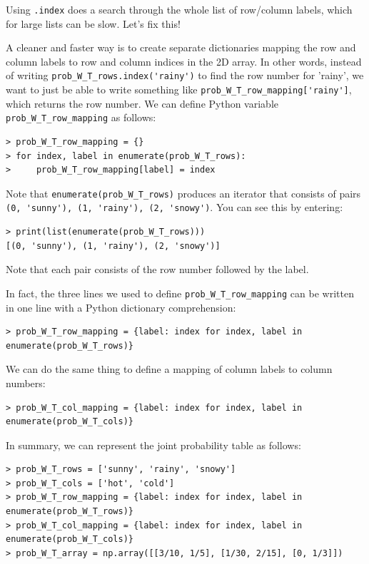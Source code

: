 \documentclass[6008notes.tex]{subfiles}
\begin{document}
Using \texttt{.index} does a search through the whole list of row/column labels, which for large lists can be slow. Let's fix this!

A cleaner and faster way is to create separate dictionaries mapping the row and column labels to row and column indices in the 2D array. In other words, instead of writing \lstinline{prob_W_T_rows.index('rainy')} to find the row number for 'rainy', we want to just be able to write something like \lstinline{prob_W_T_row_mapping['rainy']}, which returns the row number. We can define Python variable \lstinline{prob_W_T_row_mapping} as follows:

\begin{lstlisting}
> prob_W_T_row_mapping = {}
> for index, label in enumerate(prob_W_T_rows):
>     prob_W_T_row_mapping[label] = index
\end{lstlisting}

Note that \lstinline{enumerate(prob_W_T_rows)} produces an iterator that consists of pairs \lstinline{(0, 'sunny'), (1, 'rainy'), (2, 'snowy')}. You can see this by entering:

\begin{lstlisting}
> print(list(enumerate(prob_W_T_rows)))
[(0, 'sunny'), (1, 'rainy'), (2, 'snowy')]
\end{lstlisting}

Note that each pair consists of the row number followed by the label.

In fact, the three lines we used to define \lstinline{prob_W_T_row_mapping} can be written in one line with a Python dictionary comprehension:

\begin{lstlisting}
> prob_W_T_row_mapping = {label: index for index, label in enumerate(prob_W_T_rows)}
\end{lstlisting}

We can do the same thing to define a mapping of column labels to column numbers:

\begin{lstlisting}
> prob_W_T_col_mapping = {label: index for index, label in enumerate(prob_W_T_cols)}
\end{lstlisting}

In summary, we can represent the joint probability table as follows:

\begin{lstlisting}
> prob_W_T_rows = ['sunny', 'rainy', 'snowy']
> prob_W_T_cols = ['hot', 'cold']
> prob_W_T_row_mapping = {label: index for index, label in enumerate(prob_W_T_rows)}
> prob_W_T_col_mapping = {label: index for index, label in enumerate(prob_W_T_cols)}
> prob_W_T_array = np.array([[3/10, 1/5], [1/30, 2/15], [0, 1/3]])
\end{lstlisting}
\end{document}

